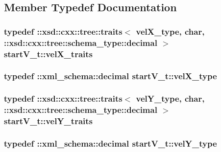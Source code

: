 \subsection{Member Typedef Documentation}
\hypertarget{classstartV__t_aee57fb6e5210e3f5cdb037863d901086}{
\subsubsection[{vel\-X\-\_\-traits}]{\setlength{\rightskip}{0pt plus 5cm}typedef \-::xsd\-::cxx\-::tree\-::traits$<$ {\bf vel\-X\-\_\-type}, char, \-::xsd\-::cxx\-::tree\-::schema\-\_\-type\-::decimal $>$ {\bf start\-V\-\_\-t\-::vel\-X\-\_\-traits}}}\label{classstartV__t_aee57fb6e5210e3f5cdb037863d901086}
\hypertarget{classstartV__t_aac8a2d74e6be7ae3248ba26d253ad3fc}{
\subsubsection[{vel\-X\-\_\-type}]{\setlength{\rightskip}{0pt plus 5cm}typedef \-::{\bf xml\-\_\-schema\-::decimal} {\bf start\-V\-\_\-t\-::vel\-X\-\_\-type}}}\label{classstartV__t_aac8a2d74e6be7ae3248ba26d253ad3fc}
\hypertarget{classstartV__t_a004e9fe52571fa7204d075feb71c244e}{
\subsubsection[{vel\-Y\-\_\-traits}]{\setlength{\rightskip}{0pt plus 5cm}typedef \-::xsd\-::cxx\-::tree\-::traits$<$ {\bf vel\-Y\-\_\-type}, char, \-::xsd\-::cxx\-::tree\-::schema\-\_\-type\-::decimal $>$ {\bf start\-V\-\_\-t\-::vel\-Y\-\_\-traits}}}\label{classstartV__t_a004e9fe52571fa7204d075feb71c244e}
\hypertarget{classstartV__t_acfa8dd01ff687d610335845945099743}{
\subsubsection[{vel\-Y\-\_\-type}]{\setlength{\rightskip}{0pt plus 5cm}typedef \-::{\bf xml\-\_\-schema\-::decimal} {\bf start\-V\-\_\-t\-::vel\-Y\-\_\-type}}}\label{classstartV__t_acfa8dd01ff687d610335845945099743}
